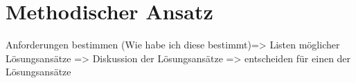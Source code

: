 \section{Methodischer Ansatz}
Anforderungen bestimmen (Wie habe ich diese bestimmt)=> Listen möglicher Lösungsansätze => Diskussion der Lösungsansätze => entscheiden für einen der Lösungsansätze